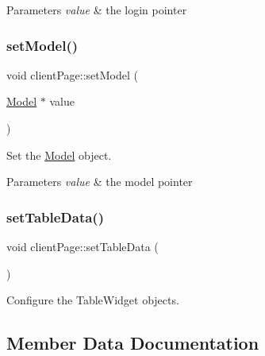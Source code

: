 \begin{DoxyParams}{Parameters}
{\em value} & the login pointer \\
\hline
\end{DoxyParams}
\mbox{\label{classclientPage_ac40930f54077f9a7050e046b535ed45c}} 
\subsubsection{\texorpdfstring{set\+Model()}{setModel()}}
{\footnotesize\ttfamily void client\+Page\+::set\+Model (\begin{DoxyParamCaption}\item[{\hyperlink{classModel}{Model} $\ast$}]{value }\end{DoxyParamCaption})}



Set the \hyperlink{classModel}{Model} object. 


\begin{DoxyParams}{Parameters}
{\em value} & the model pointer \\
\hline
\end{DoxyParams}
\mbox{\label{classclientPage_aa430c4866eaf46e93492d4b950443689}} 
\subsubsection{\texorpdfstring{set\+Table\+Data()}{setTableData()}}
{\footnotesize\ttfamily void client\+Page\+::set\+Table\+Data (\begin{DoxyParamCaption}{ }\end{DoxyParamCaption})}



Configure the Table\+Widget objects. 



\subsection{Member Data Documentation}
\mbox{\label{classclientPage_a70e3ec19ba9c4cbf70d9410173e97afd}} 
